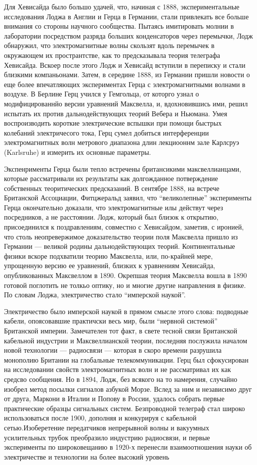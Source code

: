 \documentclass[12pt, oneside, a4paper]{article}
\begin{document}
Для Хевисайда было большо удачей, что, начиная с 1888, экспериментальные исследования Лоджа в Англии и Герца в Германии, стали привлекать все больше внимания со стороны научного сообщества. Пытаясь имитировать молнии  в лаборатории посредством разряда больших конденсаторов через перемычки, Лодж обнаружил, что электромагнитные волны скользят вдоль перемычек в окружающем их пространтстве, как то предсказывала теория телеграфа Хевисайда. Вскоер после этого Лодж и Хевисайд вступили в переписку и стали близкими компаньонами. Затем, в середине 1888, из Германии пришли новости о еще более впечатляющих экспериментах Герца с электромагнитными волнами в воздухе.  В Берлине Герц учился у Гемгольца, от которго узнал о модифицированнйо версии уравнений Максвелла, и, вдохновившись ими, решил испытать их против дальнодействующих теорий Вебера и Ньюмана. Умея воспроизводить короткие электрические вспышки при помощи быстрых колебаний электричесого тока, Герц сумел добиться интерференции электромагнитных волн метрового диапазона длин лекциооннм зале Карлсруэ (Karlsruhe) и измерить их основные параметры.

Экспенрименты Герца были тепло встречены британсикими максвеллианцами, которые рассматривали их результаты как долгожданное потверждение собственных теоритических предсказаний. В сентябре 1888, на встрече Британской Ассоциации, Фитцжеральд заявил, что ``великолепные'' эксперименты Герца окончательно доказали, что электромагнитные илы действут через посредников, а не расстоянии. Лодж, который был близок к открытию, присоединился к поздравлениям, совместно с Хевисайдом, заметив, с иронией, что столь неопревержимое доказательство теории поля Максвелла пришло из Германии --- великой родины дальнодействующих теорий. Континентальные физики вскоре подхватили теорию Максвелла, или, по-крайней мере, упрощенную версию ее уравнений, близких к уравнениям Хевисайда, опубликованных Максвеллом в 1890. Окрепшая теория Максвелла вошла в 1890 готовой поглотить не толкьо оптику, но и многие другие направления в физике. По словам Лоджа, электричество стало ``имперской наукой''.

Электричество было имперской наукой в прямом смысле этого слова: подводные кабели, опоясовавшие практичски весь мир, были ``нервной системой'' Британской империи. Замечателен тот факт, в свете тесной связи Британской кабельной индустрии и Максвеллианской теории, последняя послужила началом новой технологии --- радиосвязи --- которая в скоро времени разрушила монополию Британии на глобальные телекоммуникации. Герц был сфокусирован на исследовании свойств электромагнитных волн и не рассматривал их как средсво сообщения.  Но в 1894, Лодж, без всякого на то намерения, случайно изобрел метод посылки сигналов азбукой Морзе. Вслед за ним и независимо друг от друга, Маркони в Италии и Попову в России, удалось собрать первые практические образцы сигнальных систем. Безпроводной телеграф стал широко использоваться после 1900, дополняя и конкурируя с кабельной сетью.Изоберетение передатчиков непрерывной волны и вакуумных усилительных трубок преобразило индустрию радиосвязи, и первые эксперименты по широковещанию в 1920-х перенесли взаимоотношения науки об электричестве и технологии на более высокий уровень  
\end{document}
